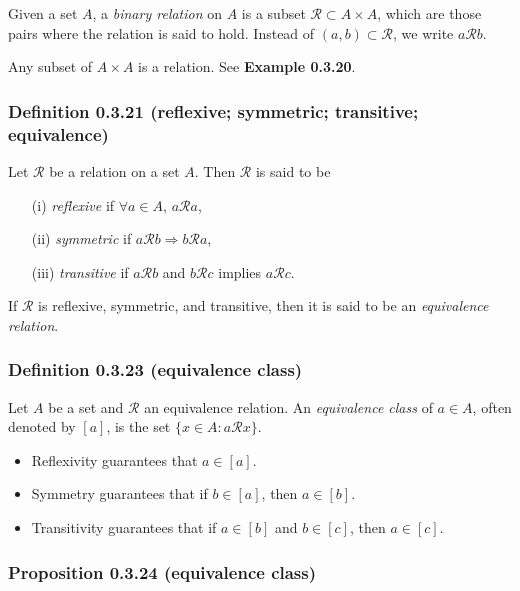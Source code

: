 \documentclass[12pt, letterpaper, oneside]{book}
\begin{document}
Given a set $A$, a \textit{binary relation} on $A$ is a subset $\mathcal{R}
  \subset A \times A$, which are those pairs where the relation is said to hold.
Instead of $(a, b) \subset \mathcal{R}$, we write $a \mathcal{R} b$.

Any subset of $A \times A$ is a relation. See \textbf{Example 0.3.20}.

\subsubsection{Definition 0.3.21 (reflexive; symmetric; transitive; equivalence)}

Let $\mathcal{R}$ be a relation on a set $A$. Then $\mathcal{R}$ is said to be
\begin{enumerate}
  \item[(i)] \textit{reflexive} if $\forall a \in A$, $a \mathcal{R} a$,
  \item[(ii)] \textit{symmetric} if $a \mathcal{R} b \Rightarrow b \mathcal{R}
          a$,
  \item[(iii)] \textit{transitive} if $a \mathcal{R} b$ and $b \mathcal{R} c$
        implies $a \mathcal{R} c$.
\end{enumerate}

If $\mathcal{R}$ is reflexive, symmetric, and transitive, then it is said to be
an \textit{equivalence relation}.

\subsubsection{Definition 0.3.23 (equivalence class)}

Let $A$ be a set and $\mathcal{R}$ an equivalence relation. An
\textit{equivalence class} of $a \in A$, often denoted by $[a]$, is the set
$\{x \in A: a \mathcal{R} x\}$.

\begin{itemize}
  \item Reflexivity guarantees that $a \in [a]$.
  \item Symmetry guarantees that if $b \in [a]$, then $a \in [b]$.
  \item Transitivity guarantees that if $a \in [b]$ and $b \in [c]$, then $a
          \in [c]$.
\end{itemize}

\subsubsection{Proposition 0.3.24 (equivalence class)}
\end{document}
